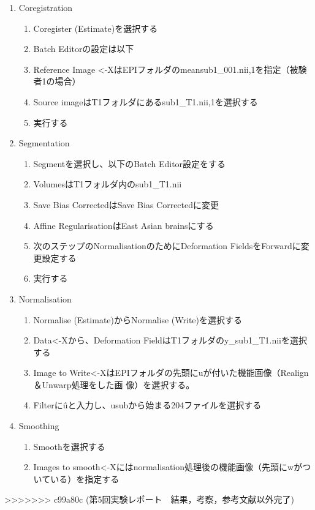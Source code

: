 \documentclass{jlreq}
\begin{document}
\begin{enumerate}
    \item Coregistration
    \begin{enumerate}
        \item Coregister (Estimate)を選択する
        \item Batch Editorの設定は以下
        \item Reference Image <-XはEPIフォルダのmeansub1\_001.nii,1を指定（被験者1の場合）
        \item Source imageはT1フォルダにあるsub1\_T1.nii,1を選択する
        \item 実行する
    \end{enumerate}
    \item Segmentation
    \begin{enumerate}
        \item Segmentを選択し、以下のBatch Editor設定をする
        \item VolumesはT1フォルダ内のsub1\_T1.nii
        \item Save Bias CorrectedはSave Bias Correctedに変更
        \item Affine RegularisationはEast Asian brainsにする
        \item 次のステップのNormalisationのためにDeformation FieldsをForwardに変更設定する
        \item 実行する
    \end{enumerate}
    \item Normalisation
    \begin{enumerate}
        \item Normalise (Estimate)からNormalise (Write)を選択する
        \item Data<-Xから、Deformation FieldはT1フォルダのy\_sub1\_T1.niiを選択する
        \item Image to Write<-XはEPIフォルダの先頭にuが付いた機能画像（Realign＆Unwarp処理をした画
        像）を選択する。
        \item Filterに\^uと入力し、usubから始まる204ファイルを選択する
        \end{enumerate}
    \item Smoothing
    \begin{enumerate}
        \item Smoothを選択する
        \item Images to smooth<-Xにはnormalisation処理後の機能画像（先頭にwがついている）を指定する  \end{enumerate}
\end{enumerate}
>>>>>>> c99a80c (第5回実験レポート　結果，考察，参考文献以外完了)
\end{document}
